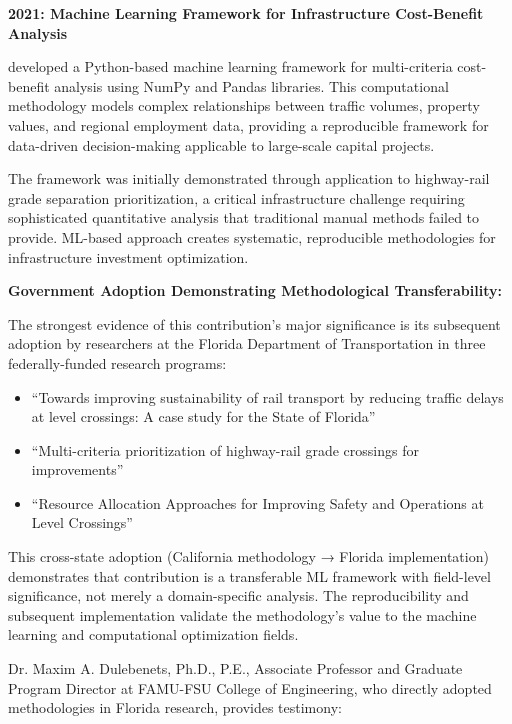 \textbf{2021: Machine Learning Framework for Infrastructure Cost-Benefit Analysis}

\dr developed a Python-based machine learning framework for multi-criteria cost-benefit analysis using NumPy and Pandas libraries. This computational methodology models complex relationships between traffic volumes, property values, and regional employment data, providing a reproducible framework for data-driven decision-making applicable to large-scale capital projects.

The framework was initially demonstrated through application to highway-rail grade separation prioritization, a critical infrastructure challenge requiring sophisticated quantitative analysis that traditional manual methods failed to provide. \drs ML-based approach creates systematic, reproducible methodologies for infrastructure investment optimization.

\textbf{Government Adoption Demonstrating Methodological Transferability:}

The strongest evidence of this contribution's major significance is its subsequent adoption by researchers at the Florida Department of Transportation in three federally-funded research programs:

\begin{itemize}
    \item ``Towards improving sustainability of rail transport by reducing traffic delays at level crossings: A case study for the State of Florida''
    \item ``Multi-criteria prioritization of highway-rail grade crossings for improvements''
    \item ``Resource Allocation Approaches for Improving Safety and Operations at Level Crossings''
\end{itemize}

This cross-state adoption (California methodology → Florida implementation) demonstrates that \drs contribution is a transferable ML framework with field-level significance, not merely a domain-specific analysis. The reproducibility and subsequent implementation validate the methodology's value to the machine learning and computational optimization fields.

Dr. Maxim A. Dulebenets, Ph.D., P.E., Associate Professor and Graduate Program Director at FAMU-FSU College of Engineering, who directly adopted \drs methodologies in Florida research, provides testimony:

